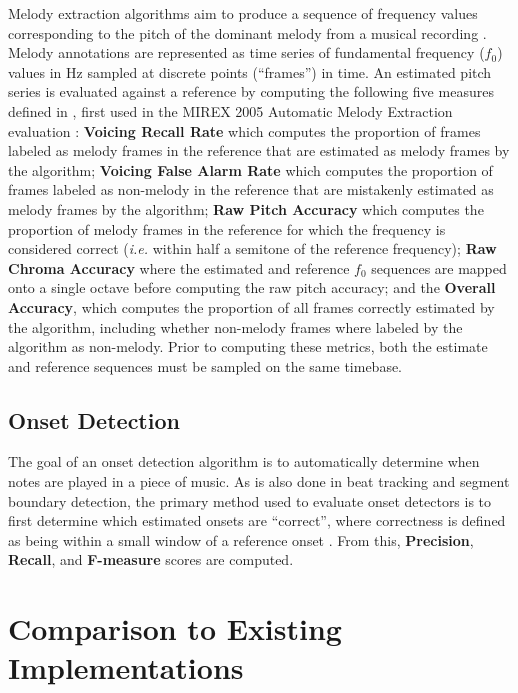 \documentclass{article}
\def\ie{\emph{i.e.}}
\begin{document}
Melody extraction algorithms aim to produce a sequence of frequency values corresponding to the pitch of the dominant melody from a musical recording \cite{salamon:MelodyReview:IEEESPM13}.
Melody annotations are represented as time series of fundamental frequency ($f_0$) values in Hz sampled at discrete points (``frames'') in time.
An estimated pitch series is evaluated against a reference by computing the following five measures defined in \cite{salamon:MelodyReview:IEEESPM13}, first used in the MIREX 2005 Automatic Melody Extraction evaluation \cite{polinerMelodyEval}:
\textbf{Voicing Recall Rate} which computes the proportion of frames labeled as melody frames in the reference that are estimated as melody frames by the algorithm;
\textbf{Voicing False Alarm Rate} which computes the proportion of frames labeled as non-melody in the reference that are mistakenly estimated as melody frames by the algorithm;
\textbf{Raw Pitch Accuracy} which computes the proportion of melody frames in the reference for which the frequency is considered correct (\ie{} within half a semitone of the reference frequency);
\textbf{Raw Chroma Accuracy} where the estimated and reference $f_0$ sequences are mapped onto a single octave before computing the raw pitch accuracy;
and the \textbf{Overall Accuracy}, which computes the proportion of all frames correctly estimated by the algorithm, including whether non-melody frames where labeled by the algorithm as non-melody.
Prior to computing these metrics, both the estimate and reference sequences must be sampled on the same timebase.

\subsection{Onset Detection}

The goal of an onset detection algorithm is to automatically determine when notes are played in a piece of music.
As is also done in beat tracking and segment boundary detection, the primary method used to evaluate onset detectors is to first determine which estimated onsets are ``correct'', where correctness is defined as being within a small window of a reference onset \cite{bock2012evaluating}.
From this, \textbf{Precision}, \textbf{Recall}, and \textbf{F-measure} scores are computed.

\section{Comparison to Existing Implementations}
\label{sec:comparison}
\end{document}
